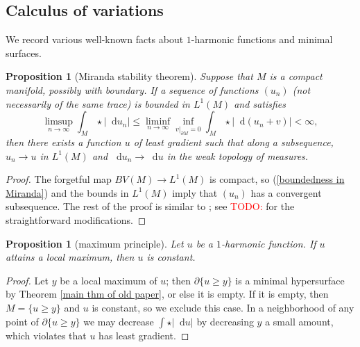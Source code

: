 \documentclass[reqno,11pt]{amsart}
\newcommand*\dif{\mathop{}\!\mathrm{d}}
\newtheorem{proposition}[theorem]{Proposition}
\theoremstyle{definition}
\numberwithin{equation}{section}
\newcommand\todo[1]{\textcolor{red}{TODO: #1}}
\begin{document}

\subsection{Calculus of variations}
We record various well-known facts about $1$-harmonic functions and minimal surfaces.

\begin{proposition}[Miranda stability theorem]
  Suppose that $M$ is a compact manifold, possibly with boundary.
	If a sequence of functions $(u_n)$ (not necessarily of the same trace) is bounded in $L^1(M)$ and satisfies
\begin{equation}\label{boundedness in Miranda}
	\limsup_{n \to \infty} \int_M \star |\dif u_n| \leq \liminf_{n \to \infty} \inf_{v|_{\partial M} = 0} \int_M \star |\dif(u_n + v)| < \infty,
\end{equation}
	then there exists a function $u$ of least gradient such that along a subsequence, $u_n \to u$ in $L^1(M)$ and $\dif u_n \to \dif u$ in the weak topology of measures.
\end{proposition}
\begin{proof}
The forgetful map $BV(M) \to L^1(M)$ is compact, so (\ref{boundedness in Miranda}) and the bounds in $L^1(M)$ imply that $(u_n)$ has a convergent subsequence.
The rest of the proof is similar to \cite[Teorema 3 and Osservazione 3]{Miranda67}; see \todo{\cite{BackusFLG}} for the straightforward modifications.
\end{proof}

\begin{proposition}[maximum principle]\label{max princip}
Let $u$ be a $1$-harmonic function.
If $u$ attains a local maximum, then $u$ is constant.
\end{proposition}
\begin{proof}
Let $y$ be a local maximum of $u$; then $\partial \{u \geq y\}$ is a minimal hypersurface by Theorem \ref{main thm of old paper}, or else it is empty. If it is empty, then $M = \{u \geq y\}$ and $u$ is constant, so we exclude this case.
In a neighborhood of any point of $\partial \{u \geq y\}$ we may decrease $\int \star |\dif u|$ by decreasing $y$ a small amount, which violates that $u$ has least gradient.
\end{proof}
\end{document}
